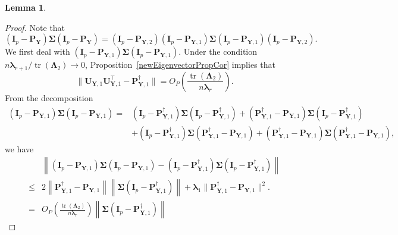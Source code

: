\documentclass[12pt]{article} %
\DeclareMathOperator{\mytr}{tr}
\newcommand{\bP}{\mathbf{P}}
\newcommand{\bY}{\mathbf{Y}}
\newcommand{\bI}{\mathbf{I}}
\newcommand{\bU}{\mathbf{U}}
\newcommand{\bfsym}[1]{\ensuremath{\boldsymbol{#1}}}
\def\blambda {\bfsym {\lambda}}
\def\bLambda {\bfsym {\Lambda}}
\def\bSigma {\bfsym {\Sigma}}
\newtheorem{lemma}{Lemma}
\theoremstyle{definition}
\begin{document}
\begin{appendices}
\begin{lemma}
\end{lemma}
\begin{proof}
    Note that
    \begin{equation}\label{cho111}
         (\bI_p-\bP_{\bY})\bSigma (\bI_p-\bP_{\bY})
         =
         (\bI_p-\bP_{\bY,2})
         (\bI_p-\bP_{\bY,1})
         \bSigma 
         (\bI_p-\bP_{\bY,1})
         (\bI_p-\bP_{\bY,2}).
    \end{equation}
We first deal with
    $
         (\bI_p-\bP_{\bY,1})
         \bSigma 
         (\bI_p-\bP_{\bY,1})
         $.
Under the condition $n\blambda_{r+1}/\mytr(\bLambda_2)\to 0$, Proposition~\ref{newEigenvectorPropCor} implies that
\begin{equation*}\label{rain1}
        \|\bU_{\bY,1}\bU_{\bY,1}^\top - 
\bP^\dagger_{\bY,1}
        \|
    =O_P\left(\frac{\mytr(\bLambda_2)}{n\blambda_r}\right).
\end{equation*}
    From the decomposition
         \begin{equation*}
         \begin{split}
         (\bI_p-\bP_{\bY,1})
         \bSigma 
         (\bI_p-\bP_{\bY,1})
         =&
         (\bI_p-\bP_{\bY,1}^{\dagger})
         \bSigma 
         (\bI_p-\bP_{\bY,1}^{\dagger})
         +
         (\bP_{\bY,1}^{\dagger}-\bP_{\bY,1})
         \bSigma 
         (\bI_p-\bP_{\bY,1}^{\dagger})
         \\
         &+
         (\bI_p-\bP_{\bY,1}^{\dagger})
         \bSigma 
         (\bP_{\bY,1}^{\dagger}-\bP_{\bY,1})
         +
         (\bP_{\bY,1}^{\dagger}-\bP_{\bY,1})
         \bSigma 
         (\bP_{\bY,1}^{\dagger}-\bP_{\bY,1}),
         \end{split}
         \end{equation*}
we have
         \begin{equation*}
         \begin{split}
         &\left\|
         (\bI_p-\bP_{\bY,1})
         \bSigma 
         (\bI_p-\bP_{\bY,1})
         -
         (\bI_p-\bP_{\bY,1}^{\dagger})
         \bSigma 
         (\bI_p-\bP_{\bY,1}^{\dagger})
         \right\|
         \\
         \leq&
         2
         \left\|\bP_{\bY,1}^{\dagger}-\bP_{\bY,1}\right\|
         \left\|\bSigma 
         (\bI_p-\bP_{\bY,1}^{\dagger})\right\|
         +
         \blambda_1\|\bP_{\bY,1}^{\dagger}-\bP_{\bY,1}\|^2.
         \\
         = &
         O_P\left(\frac{\mytr(\bLambda_2)}{n\blambda_r}\right)
         \left\|\bSigma 
         (\bI_p-\bP_{\bY,1}^{\dagger})\right\|

\end{split}
\end{equation*}
\end{proof}
\end{appendices}
\end{document}
